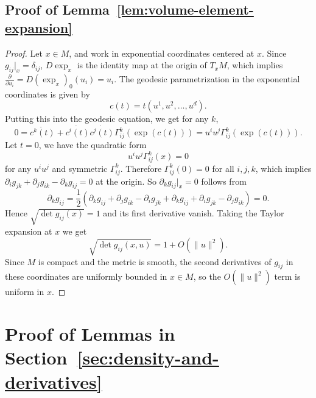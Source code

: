 \documentclass[11pt]{article}
\theoremstyle{plain}
\theoremstyle{definition}
\begin{document}
\subsection{Proof of Lemma~\ref{lem:volume-element-expansion}}\label{sec:pf-volume element expansion}
\begin{proof}
Let $x\in M$, and work in exponential coordinates centered at $x$.
Since $g_{ij} | _x  = \delta_{ij}$, $D\exp_x$ is the identity map at the origin of $T_xM$, which implies $\frac{\partial}{\partial{u_i}} = D(\exp_x)_0(u_i) = u_i.$ The geodesic parametrization in the exponential coordinates is given by 
\[
c(t) = t(u^1,u^2,\dots,u^d).
\]
Putting this into the geodesic equation, we get for any $k$, 
\[
0 = \ddot{c^k(t)}  + \dot{c^i(t)}\dot{c^j(t)}\Gamma_{ij}^k(\exp (c(t))) = u^iu^j\Gamma_{ij}^k(\exp (c(t))).
\]
Let $t=0$, we have the quadratic form
\[
u^iu^j\Gamma_{ij}^k(x) = 0
\]
for any $u^iu^j$ and symmetric $\Gamma_{ij}^k$. Therefore $\Gamma^k_{ij}(0) = 0$ for all $i,j,k$, which implies $\partial_i g_{jk} + \partial_j g_{ik} - \partial_k g_{ij} = 0 $ at the origin. So $\partial_k g_{ij}|_x = 0$ follows from 
\[
\partial_k g_{ij} = \frac{1}{2}(\partial_k g_{ij} + \partial_j g_{ik} - \partial_i g_{jk}+ \partial_k g_{ij} + \partial_i g_{jk} - \partial_j g_{ik}) = 0.
\]
Hence $\sqrt{\operatorname{det} g_{ij}(x)} = 1$ and its first derivative vanish. Taking the Taylor expansion at $x$ we get 
\[
\sqrt{\operatorname{det} g_{ij}(x,u)} = 1 + O(\|u\|^2).
\]
Since $M$ is compact and the metric is smooth, the second derivatives of $g_{ij}$ in these coordinates are uniformly bounded in $x\in M$, so the $O(\|u\|^2)$ term is uniform in $x$.
\end{proof}


\section{Proof of Lemmas in Section~\ref{sec:density-and-derivatives}}
\label{app:lemma-sec3}
\end{document}
